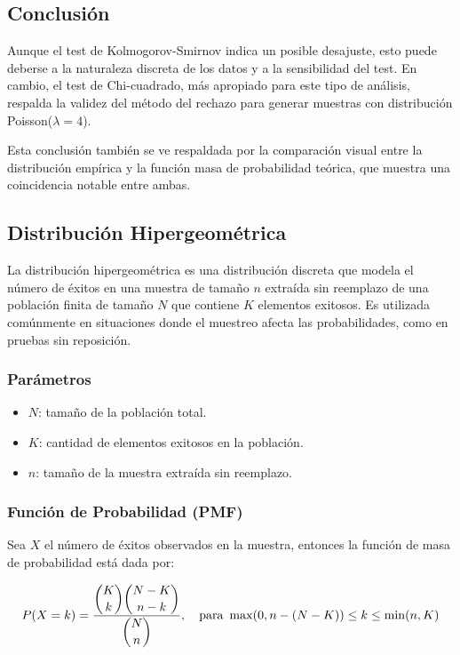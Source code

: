 \documentclass{article}
\begin{document}
\subsection{Conclusión}

Aunque el test de Kolmogorov-Smirnov indica un posible desajuste, esto puede deberse a la naturaleza discreta de los datos y a la sensibilidad del test. En cambio, el test de Chi-cuadrado, más apropiado para este tipo de análisis, respalda la validez del método del rechazo para generar muestras con distribución Poisson(\(\lambda = 4\)).

Esta conclusión también se ve respaldada por la comparación visual entre la distribución empírica y la función masa de probabilidad teórica, que muestra una coincidencia notable entre ambas.





\subsection{Distribución Hipergeométrica}
La distribución hipergeométrica es una distribución discreta que modela el número de éxitos en una muestra de tamaño $n$ extraída sin reemplazo de una población finita de tamaño $N$ que contiene $K$ elementos exitosos. Es utilizada comúnmente en situaciones donde el muestreo afecta las probabilidades, como en pruebas sin reposición.

\subsubsection*{Parámetros}
\begin{itemize}
  \item $N$: tamaño de la población total.
  \item $K$: cantidad de elementos exitosos en la población.
  \item $n$: tamaño de la muestra extraída sin reemplazo.
\end{itemize}

\subsubsection*{Función de Probabilidad (PMF)}
Sea $X$ el número de éxitos observados en la muestra, entonces la función de masa de probabilidad está dada por:

\[
P(X = k) = \frac{\dbinom{K}{k} \dbinom{N-K}{n-k}}{\dbinom{N}{n}}, \quad \text{para } \max(0, n - (N-K)) \leq k \leq \min(n, K)
\]
\end{document}

